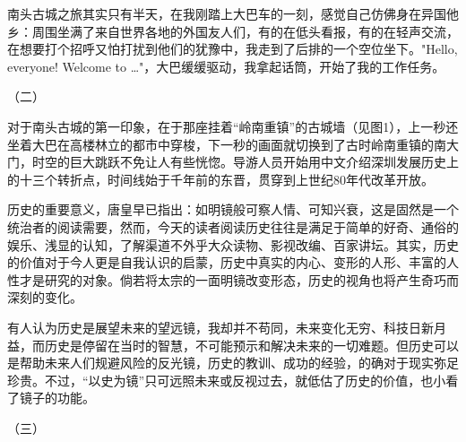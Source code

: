 \documentclass[UTF8]{ctexart}
\begin{document}
南头古城之旅其实只有半天，在我刚踏上大巴车的一刻，感觉自己仿佛身在异国他乡：周围坐满了来自世界各地的外国友人们，有的在低头看报，有的在轻声交流，在想要打个招呼又怕打扰到他们的犹豫中，我走到了后排的一个空位坐下。"Hello, everyone! Welcome to \dots"，大巴缓缓驱动，我拿起话筒，开始了我的工作任务。

\begin{center}
    （二）
\end{center}

对于南头古城的第一印象，在于那座挂着“岭南重镇”的古城墙（见图1），上一秒还坐着大巴在高楼林立的都市中穿梭，下一秒的画面就切换到了古时岭南重镇的南大门，时空的巨大跳跃不免让人有些恍惚。导游人员开始用中文介绍深圳发展历史上的十三个转折点，时间线始于千年前的东晋，贯穿到上世纪80年代改革开放。


历史的重要意义，唐皇早已指出：如明镜般可察人情、可知兴衰，这是固然是一个统治者的阅读需要，然而，今天的读者阅读历史往往是满足于简单的好奇、通俗的娱乐、浅显的认知，了解渠道不外乎大众读物、影视改编、百家讲坛。其实，历史的价值对于今人更是自我认识的启蒙，历史中真实的内心、变形的人形、丰富的人性才是研究的对象。倘若将太宗的一面明镜改变形态，历史的视角也将产生奇巧而深刻的变化。

有人认为历史是展望未来的望远镜，我却并不苟同，未来变化无穷、科技日新月益，而历史是停留在当时的智慧，不可能预示和解决未来的一切难题。但历史可以是帮助未来人们规避风险的反光镜，历史的教训、成功的经验，的确对于现实弥足珍贵。不过，“以史为镜”只可远照未来或反视过去，就低估了历史的价值，也小看了镜子的功能。

\begin{figure}[htbp]
    \centering
\end{figure}
\begin{center}
    （三）
\end{center}
\end{document}

